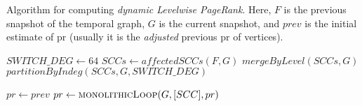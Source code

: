 \begin{algorithm}[!hbtp]
\caption{Algorithm for computing \emph{dynamic Levelwise PageRank}. Here, $F$ is the previous snapshot of the temporal graph, $G$ is the current snapshot, and $prev$ is the initial estimate of pr (usually it is the \emph{adjusted} previous pr of vertices).}
\label{alg:levelwise}
\begin{algorithmic}
  \State $SWITCH\_DEG \gets 64$ 
  \State $SCCs \gets affectedSCCs(F, G)$
  \State $mergeByLevel(SCCs, G)$
    \State $partitionByIndeg(SCCs, G, SWITCH\_DEG)$
  \EndIf
\EndFunction

\Statex

  \State $pr \gets prev$
    \State $pr \gets \textsc{monolithicLoop}(G, [SCC], pr)$ \\  
  \EndFor
\EndFunction
\end{algorithmic}
\end{algorithm}
